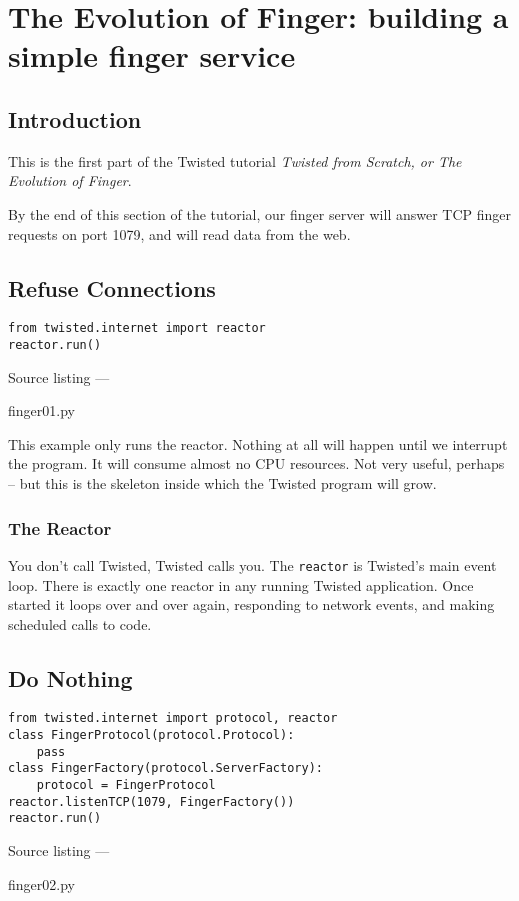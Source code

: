 \section{The Evolution of Finger: building a simple finger service\label{doc/howto/tutorial/intro.xhtml}}


\subsection{Introduction}


 This is the first part of the Twisted tutorial \textit{Twisted from Scratch, or The Evolution of Finger}.

By the end of this section of the tutorial, our finger server will answer TCP finger requests on port 1079, and will read data from the web.

\subsection{Refuse Connections}
\begin{verbatim}
from twisted.internet import reactor
reactor.run()
\end{verbatim}\parbox[b]{\linewidth}{\begin{center}Source listing --- \begin{em}finger01.py\end{em}\end{center}}

This example only runs the reactor. Nothing at all will happen until we interrupt the program.  It will consume almost no CPU resources. Not very useful, perhaps -- but this is the skeleton inside which the Twisted program will grow. 

\subsubsection{The Reactor}


 You don't call Twisted, Twisted calls you. The \texttt{reactor} is Twisted's main event loop. There is exactly one reactor in any running Twisted application. Once started it loops over and over again, responding to network events, and making scheduled calls to code. 

\subsection{Do Nothing}
\begin{verbatim}
from twisted.internet import protocol, reactor
class FingerProtocol(protocol.Protocol):
    pass
class FingerFactory(protocol.ServerFactory):
    protocol = FingerProtocol
reactor.listenTCP(1079, FingerFactory())
reactor.run()
\end{verbatim}\parbox[b]{\linewidth}{\begin{center}Source listing --- \begin{em}finger02.py\end{em}\end{center}}

